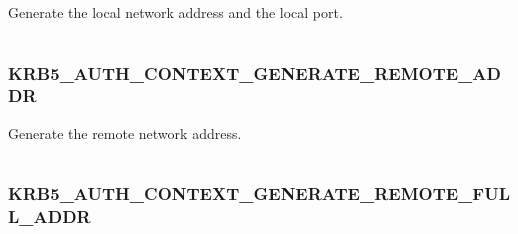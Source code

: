 \documentclass[letterpaper,10pt,english]{sphinxmanual}
\begin{document}
Generate the local network address and the local port.

\begin{tabulary}{\linewidth}{|L|L|}
\hline

 & 
\\
\hline\end{tabulary}



\subsubsection{KRB5\_AUTH\_CONTEXT\_GENERATE\_REMOTE\_ADDR}
\label{appdev/refs/macros/KRB5_AUTH_CONTEXT_GENERATE_REMOTE_ADDR:krb5-auth-context-generate-remote-addr-data}\label{appdev/refs/macros/KRB5_AUTH_CONTEXT_GENERATE_REMOTE_ADDR:krb5-auth-context-generate-remote-addr}\label{appdev/refs/macros/KRB5_AUTH_CONTEXT_GENERATE_REMOTE_ADDR::doc}

\begin{fulllineitems}
\label{appdev/refs/macros/KRB5_AUTH_CONTEXT_GENERATE_REMOTE_ADDR:KRB5_AUTH_CONTEXT_GENERATE_REMOTE_ADDR}
\end{fulllineitems}


Generate the remote network address.

\begin{tabulary}{\linewidth}{|L|L|}
\hline

 & 
\\
\hline\end{tabulary}



\subsubsection{KRB5\_AUTH\_CONTEXT\_GENERATE\_REMOTE\_FULL\_ADDR}
\label{appdev/refs/macros/KRB5_AUTH_CONTEXT_GENERATE_REMOTE_FULL_ADDR:krb5-auth-context-generate-remote-full-addr}\label{appdev/refs/macros/KRB5_AUTH_CONTEXT_GENERATE_REMOTE_FULL_ADDR::doc}\label{appdev/refs/macros/KRB5_AUTH_CONTEXT_GENERATE_REMOTE_FULL_ADDR:krb5-auth-context-generate-remote-full-addr-data}

\begin{fulllineitems}
\label{appdev/refs/macros/KRB5_AUTH_CONTEXT_GENERATE_REMOTE_FULL_ADDR:KRB5_AUTH_CONTEXT_GENERATE_REMOTE_FULL_ADDR}
\end{fulllineitems}
\end{document}
